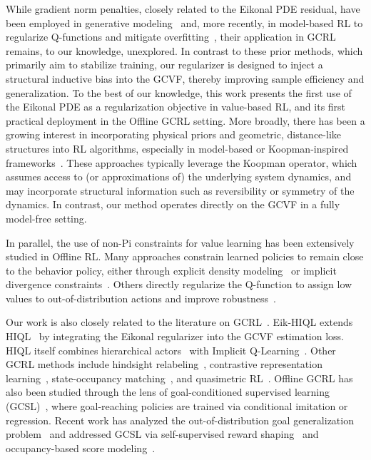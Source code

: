 \documentclass{article}
\theoremstyle{plain}
\theoremstyle{definition}
\theoremstyle{remark}
\begin{document}
While gradient norm penalties, closely related to the Eikonal PDE residual, have been employed in generative modeling~\cite{gulrajani2017improved} and, more recently, in model-based RL to regularize Q-functions and mitigate overfitting~\cite{zheng2023model}, their application in GCRL remains, to our knowledge, unexplored. In contrast to these prior methods, which primarily aim to stabilize training, our regularizer is designed to inject a structural inductive bias into the GCVF, thereby improving sample efficiency and generalization. To the best of our knowledge, this work presents the first use of the Eikonal PDE as a regularization objective in value-based RL, and its first practical deployment in the Offline GCRL setting. More broadly, there has been a growing interest in incorporating physical priors and geometric, distance-like structures into RL algorithms, especially in model-based or Koopman-inspired frameworks~\cite{weissenbacher2022koopman, cheng2023look}. These approaches typically leverage the Koopman operator, which assumes access to (or approximations of) the underlying system dynamics, and may incorporate structural information such as reversibility or symmetry of the dynamics. In contrast, our method operates directly on the GCVF in a fully model-free setting. 

In parallel, the use of non-Pi constraints for value learning has been extensively studied in Offline RL. Many approaches constrain learned policies to remain close to the behavior policy, either through explicit density modeling~\cite{wu2019behavior, fujimoto2019off, kumar2019stabilizing} or implicit divergence constraints~\cite{wang2020critic, peng2019advantage}. Others directly regularize the Q-function to assign low values to out-of-distribution actions and improve robustness~\cite{kostrikov2021offline, kumar2020conservative}.

Our work is also closely related to the literature on GCRL~\cite{kaelbling1993learning, schaul2015universal}. Eik-HIQL extends HIQL~\cite{park2024hiql} by integrating the Eikonal regularizer into the GCVF estimation loss. HIQL itself combines hierarchical actors~\cite{sutton1999between, giammarino2021online} with Implicit Q-Learning~\cite{kostrikov2021offline}. Other GCRL methods include hindsight relabeling~\cite{andrychowicz2017hindsight}, contrastive representation learning~\cite{eysenbach2022contrastive}, state-occupancy matching~\cite{ma2022offline}, and quasimetric RL~\cite{wang2023optimal}.
Offline GCRL has also been studied through the lens of goal-conditioned supervised learning (GCSL)~\cite{chebotar2021actionable, yang2022rethinking}, where goal-reaching policies are trained via conditional imitation or regression. Recent work has analyzed the out-of-distribution goal generalization problem~\cite{yang2023essential} and addressed GCSL via self-supervised reward shaping~\cite{mezghani2023learning} and occupancy-based score modeling~\cite{sikchi2023smore}. 
\end{document}
